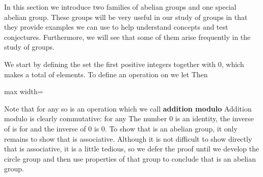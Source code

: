 \documentclass[11pt,oneside]{article}
\begin{document}
\fi
\renewcommand{\BookFooter}{Section 3 Abelian Examples}
\ifdefined\BookMaster\else\setcounter{page}{32}\fi
\BookNarrativetrue

\begin{BookBody}


\noindent In this section we introduce two families of abelian groups and one special abelian group. These groups will be very useful in our study of groups in that they provide examples we can use to help understand concepts and test conjectures. Furthermore, we will see that some of them arise frequently in the study of groups.

We start by defining the set  the first  positive integers together with 0, which makes a total of  elements. To define an operation  on  we let  Then

\begin{center}\begin{adjustbox}{max width=\linewidth}\end{adjustbox}\end{center}

Note that for any  so  is an operation which we call\textbf{ addition modulo}  Addition modulo  is clearly commutative:  for any  The number 0 is an identity, the inverse of  is  for  and the inverse of 0 is 0. To show that  is an abelian group, it only remains to show that  is associative. Although it is not difficult to show directly that  is associative, it is a little tedious, so we defer the proof until we develop the circle group and then use properties of that group to conclude that  is an abelian group.


\end{BookBody}
\end{document}
